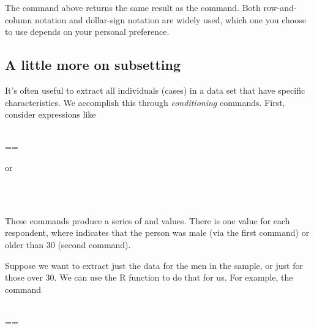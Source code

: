 \documentclass[11pt]{article}
\begin{document}
The command above returns the same result as the \texttt{\hlkeyword{[}\hlkeyword{:}\hlkeyword{,}\hlkeyword{]}} command. Both row-and-column notation and dollar-sign notation are widely used, which one you choose to use depends on your personal preference.


\subsection*{A little more on subsetting}
It's often useful to extract all individuals (cases) in a data set that have specific characteristics. We accomplish this through \emph{conditioning} commands.  First, consider expressions like

\ttfamily\noindent
\hlstd{}\hspace*{\fill}\\
\hlstd{}\hlkeyword{\usebox{\hlnormalsizeboxdollar}}=={\ }\hspace*{\fill}\\
\normalfont

or

\ttfamily\noindent
\hlstd{}\hspace*{\fill}\\
\hlstd{}\hlkeyword{\usebox{\hlnormalsizeboxdollar}}\hlkeyword{\usebox{\hlnormalsizeboxgreaterthan}}{\ }\hspace*{\fill}\\
\normalfont

These commands produce a series of \texttt{} and \texttt{}  values. There is one value for each respondent, where \texttt{} indicates that the person was male (via the first command) or older than 30 (second command).

Suppose we want to extract just the data for the men in the sample, or just for those over 30. We can use the R function \texttt{} to do that for us. For example, the command

\ttfamily\noindent
\hlstd{}\hspace*{\fill}\\
\hlstd{}\hlassignement{\usebox{\hlnormalsizeboxlessthan}-}{\ }\hlkeyword{(}\hlkeyword{,}{\ }\hlkeyword{\usebox{\hlnormalsizeboxdollar}}=={\ }\hlkeyword{)}\hspace*{\fill}\\
\normalfont
\end{document}
